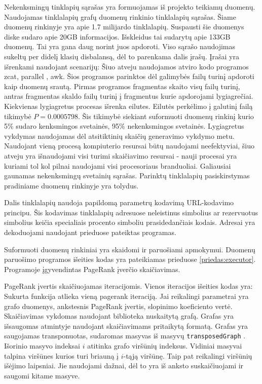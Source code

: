 Nekenksmingų tinklapių sąrašas yra formuojamas iš \cite{webgraph} projekto teikiamų duomenų. Naudojamas tinklalapių grafų duomenų rinkinio tinklalapių sąrašas. Šiame duomenų rinkinyje yra apie 1.7 milijardo tinklalapių. Suspausti šie duomenys diske sudaro apie 20GB informacijos. Išskleidus tai sudarytų apie 133GB duomenų. Tai yra gana daug norint juos apdoroti. Viso sąrašo naudojimas sukeltų per didelį klasių disbalansą, dėl to parenkama dalis įrašų. Įrašai yra išrenkami naudojant scenarijų:
Šiuo atveju naudojamos atviro kodo programos zcat, parallel \cite{parallel}, awk. Šios programos parinktos dėl galimybės failų turinį apdoroti kaip duomenų srautą.   Pirmas programos fragmentas skaito visų failų turinį, antras fragmentas skaldo failų turinį į fragmentus kurie apdorojami lygiagrečiai. Kiekvienas lygiagretus procesas išrenka eilutes. Eilutės perkėlimo į galutinį failą tikimybė $P = 0.0005798$. Šis tikimybė siekiant suformuoti duomenų rinkinį kurio 5\% sudaro kenksmingos svetainės, 95\% nekenksmingos svetainės. Lygiagretus vykdymas naudojamas dėl atsitiktinių skaičių generavimo vykdymo metu. Naudojant vieną procesą kompiuterio resursai būtų naudojami neefektyviai, šiuo atveju yra išnaudojami visi turimi skaičiavimo resursai - nauji procesai yra kuriami tol kol pilnai naudojami visi procesoriaus branduoliai. Galiausiai gaunamas nekenksmingų svetainių sąrašas. Parinktų tinklalapių pasiskirstymas pradiniame duomenų rinkinyje yra tolydus.

Dalis tinklalapių naudoja papildomą parametrų kodavimą URL-kodavimo principu. Šis kodavimas tinklalapių adresuose neleistinus simbolius ar rezervuotus simbolius keičia specialiais procento simboliu prasidedančiais kodais. Adresai yra dekoduojami naudojant prieduose pateiktas programas.


Suformuoti duomenų rinkiniai yra skaidomi ir paruošiami apmokymui. Duomenų paruošimo programos išeities kodas yra pateikiamas prieduose \ref{priedas:executor}. Programoje įgyvendintas PageRank įverčio skaičiavimas.

PageRank įvertis skaičiuojamas iteracijomis. Vienos iteracijos išeities kodas yra:
Sukurta funkcija atlieka vieną pagerank iteraciją. Jai reikalingi  parametrai yra grafo duomenys, ankstesnis PageRank įvertis, slopinimo koeficiento vertė. Skaičiavimas vykdomas naudojant biblioteka \cite{webgraph} nuskaitytą grafą. Grafas yra išsaugomas atmintyje naudojant skaičiavimams pritaikytą formatą. Grafas yra saugojamas transponuotas, sudaromas masyvas iš masyvų \texttt{transposedGraph} . Išorinio masyvo indeksai $i$ atitinka grafo viršūnių indeksus. Vidiniai masyvai talpina viršūnes kurios turi briauną į $i$-tąją viršūnę. Taip pat reikalingi viršūnių išėjimo laipsniai. Jie naudojami dažnai, dėl to yra iš anksto suskaičiuojami ir saugomi kitame masyve.

